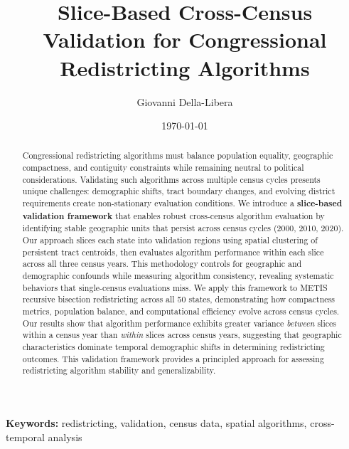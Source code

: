 \documentclass[12pt]{article}
\title{Slice-Based Cross-Census Validation for Congressional Redistricting Algorithms}
\author{
Giovanni Della-Libera
}
\date{\today}
\begin{document}
\maketitle

\begin{abstract}
Congressional redistricting algorithms must balance population equality, geographic compactness, and contiguity constraints while remaining neutral to political considerations. Validating such algorithms across multiple census cycles presents unique challenges: demographic shifts, tract boundary changes, and evolving district requirements create non-stationary evaluation conditions. We introduce a \textbf{slice-based validation framework} that enables robust cross-census algorithm evaluation by identifying stable geographic units that persist across census cycles (2000, 2010, 2020). Our approach slices each state into validation regions using spatial clustering of persistent tract centroids, then evaluates algorithm performance within each slice across all three census years. This methodology controls for geographic and demographic confounds while measuring algorithm consistency, revealing systematic behaviors that single-census evaluations miss. We apply this framework to METIS recursive bisection redistricting across all 50 states, demonstrating how compactness metrics, population balance, and computational efficiency evolve across census cycles. Our results show that algorithm performance exhibits greater variance \textit{between} slices within a census year than \textit{within} slices across census years, suggesting that geographic characteristics dominate temporal demographic shifts in determining redistricting outcomes. This validation framework provides a principled approach for assessing redistricting algorithm stability and generalizability.
\end{abstract}

\noindent\textbf{Keywords:} redistricting, validation, census data, spatial algorithms, cross-temporal analysis











\end{document}
